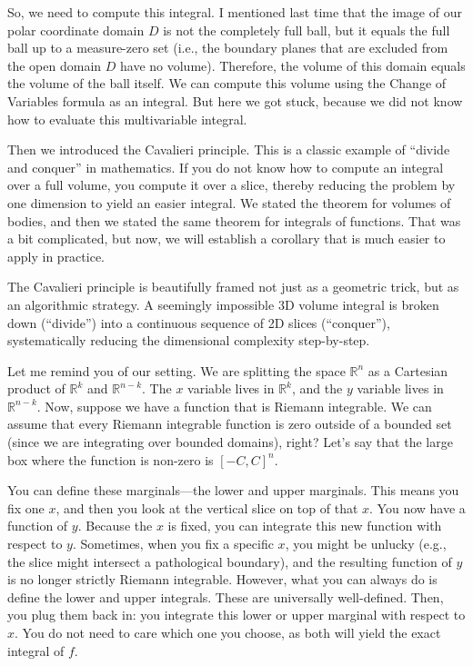 \begin{spoken-clean}[00:02:08 - 00:04:18]
So, we need to compute this integral. I mentioned last time that the image of our polar coordinate domain $D$ is not the completely full ball, but it equals the full ball up to a measure-zero set (i.e., the boundary planes that are excluded from the open domain $D$ have no volume). Therefore, the volume of this domain equals the volume of the ball itself. We can compute this volume using the Change of Variables formula as an integral. But here we got stuck, because we did not know how to evaluate this multivariable integral.

Then we introduced the Cavalieri principle. This is a classic example of ``divide and conquer'' in mathematics. If you do not know how to compute an integral over a full volume, you compute it over a slice, thereby reducing the problem by one dimension to yield an easier integral. We stated the theorem for volumes of bodies, and then we stated the same theorem for integrals of functions. That was a bit complicated, but now, we will establish a corollary that is much easier to apply in practice.
\end{spoken-clean}

\begin{didactic-insight}
The Cavalieri principle is beautifully framed not just as a geometric trick, but as an algorithmic strategy. A seemingly impossible 3D volume integral is broken down (``divide'') into a continuous sequence of 2D slices (``conquer''), systematically reducing the dimensional complexity step-by-step.
\end{didactic-insight}

\begin{spoken-clean}[00:04:18 - 00:06:07]
Let me remind you of our setting. We are splitting the space $\mathbb{R}^n$ as a Cartesian product of $\mathbb{R}^k$ and $\mathbb{R}^{n-k}$. The $x$ variable lives in $\mathbb{R}^k$, and the $y$ variable lives in $\mathbb{R}^{n-k}$. Now, suppose we have a function that is Riemann integrable. We can assume that every Riemann integrable function is zero outside of a bounded set (since we are integrating over bounded domains), right? Let's say that the large box where the function is non-zero is $[-C, C]^n$. 

You can define these marginals—the lower and upper marginals. This means you fix one $x$, and then you look at the vertical slice on top of that $x$. You now have a function of $y$. Because the $x$ is fixed, you can integrate this new function with respect to $y$. Sometimes, when you fix a specific $x$, you might be unlucky (e.g., the slice might intersect a pathological boundary), and the resulting function of $y$ is no longer strictly Riemann integrable. However, what you can always do is define the lower and upper integrals. These are universally well-defined. Then, you plug them back in: you integrate this lower or upper marginal with respect to $x$. You do not need to care which one you choose, as both will yield the exact integral of $f$.
\end{spoken-clean}

